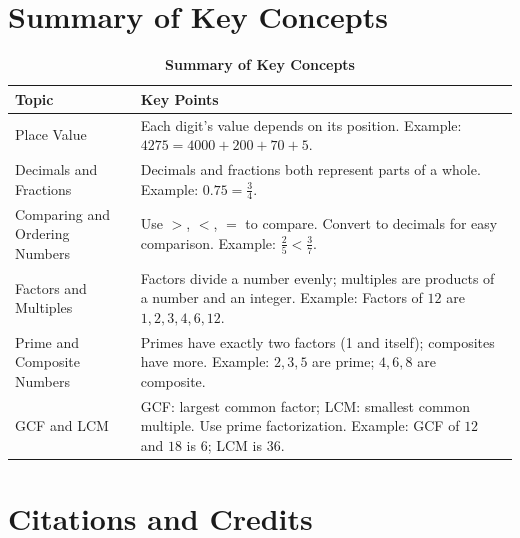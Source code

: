 \section*{Summary of Key Concepts}
\begin{table}[h!]
\centering
\renewcommand{\arraystretch}{1.3}
\begin{tabularx}{\textwidth}{|l|X|}
\hline
\rowcolor[HTML]{E0E0E0}
\textbf{Topic} & \textbf{Key Points} \\
\hline
Place Value & Each digit's value depends on its position. Example: $4275 = 4000 + 200 + 70 + 5$. \\
\hline
Decimals and Fractions & Decimals and fractions both represent parts of a whole. Example: $0.75 = \frac{3}{4}$. \\
\hline
Comparing and Ordering Numbers & Use $>$, $<$, $=$ to compare. Convert to decimals for easy comparison. Example: $\frac{2}{5} < \frac{3}{7}$. \\
\hline
Factors and Multiples & Factors divide a number evenly; multiples are products of a number and an integer. Example: Factors of $12$ are $1,2,3,4,6,12$. \\
\hline
Prime and Composite Numbers & Primes have exactly two factors (1 and itself); composites have more. Example: $2,3,5$ are prime; $4,6,8$ are composite. \\
\hline
GCF and LCM & GCF: largest common factor; LCM: smallest common multiple. Use prime factorization. Example: GCF of $12$ and $18$ is $6$; LCM is $36$. \\
\hline
\end{tabularx}
\caption{\textbf{Summary of Key Concepts}}
\end{table}


\newpage


\section*{Citations and Credits}

